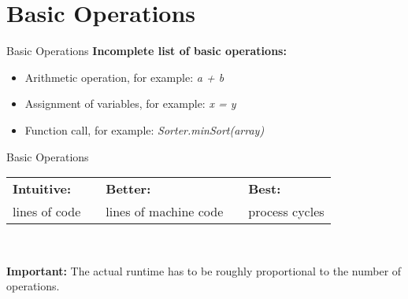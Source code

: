 \section{Basic Operations}

\begin{frame}{Basic Operations}
  \textbf{Incomplete list of basic operations:}
  \begin{center}
    \begin{itemize}
      \item
        Arithmetic operation, for example: \textit{a + b}
      \item
        Assignment of variables, for example: \textit{x = y}
      \item
        Function call, for example: \textit{Sorter.minSort(array)}
    \end{itemize}
  \end{center}
\end{frame}


\begin{frame}{Basic Operations}
  \begin{tabularx}{\textwidth}{@{}XcXcX@{}}
    \cellcolor{MainA} {\color{white}\textbf{Intuitive:}} &
    {} &
    \cellcolor{MainA} {\color{white}\textbf{Better:}} &
    {} &
    \cellcolor{MainA} {\color{white}\textbf{Best:}}\\[0.5em]
    \rule{0pt}{1.25em}\cellcolor{MainALight}lines of code &
    {} &
    \cellcolor{MainALight}lines of machine code &
    {} &
    \cellcolor{MainALight}process cycles
  \end{tabularx}\\[1.5em]
  \begin{alertblock}{\textbf{Important:}}
    The actual runtime has to be roughly proportional
    to the number of operations.
  \end{alertblock}
\end{frame}